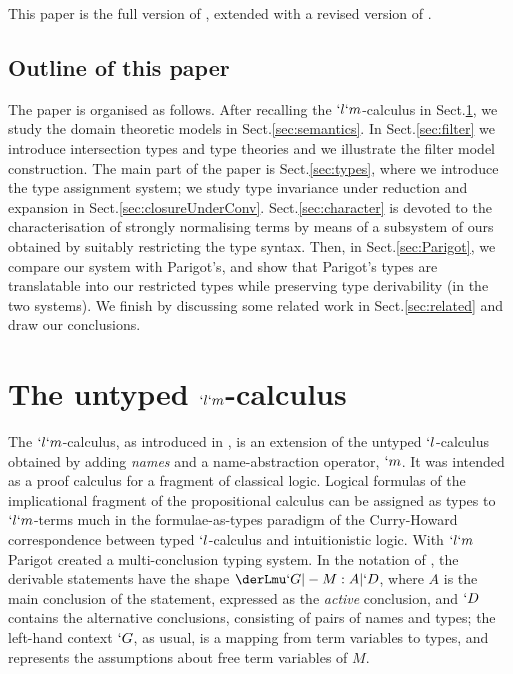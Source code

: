\documentclass{lmcs}
\begin{document}
\noindent
This paper is the full version of \cite{Bakel-Barbanera-deLiguoro-TLCA'11}, extended with a revised version of \cite{BakBdL-ITRS12}.

 \subsection*{Outline of this paper}
The paper is organised as follows. 
After recalling the $`l`m$-calculus in Sect.\skp\ref{sec:calculus}, we study the domain theoretic models in Sect.\skp\ref{sec:semantics}. 
In Sect.\skp\ref{sec:filter} we introduce intersection types and type theories and we illustrate the filter model construction.
The main part of the paper is Sect.\skp\ref{sec:types}, where we introduce the type assignment system; we study type invariance under reduction and expansion in Sect.\skp\ref{sec:closureUnderConv}.
Sect.\skp\ref{sec:character} is devoted to the characterisation of strongly normalising terms by means of a subsystem of ours obtained by suitably restricting the type syntax. 
Then, in Sect.\skp\ref{sec:Parigot}, we compare our system with Parigot's, and show that Parigot's types are translatable into our restricted types while preserving type derivability (in the two systems). 
We finish by discussing some related work in Sect.\skp\ref{sec:related} and draw our conclusions. 

% 

 \section{The untyped $`l`m$-calculus} \label{sec:calculus}
The $`l`m$-calculus, as introduced in \cite{Parigot'92}, is an extension of the untyped $`l$-calculus obtained by adding \emph{names} and a name-abstraction operator, $`m$. 
It was intended as a proof calculus for a fragment of classical logic. 
Logical formulas of the implicational fragment of the propositional calculus can be assigned as types to $`l`m$-terms much in the formulae-as-types paradigm of the Curry-Howard correspondence between typed $`l$-calculus and intuitionistic logic. 
With $`l`m$ Parigot created a multi-conclusion typing system. 
In the notation of \cite{Saurin'08}, the derivable statements have the shape $\derLmu `G |- M : A | `D $, where $A$ is the main conclusion of the statement, expressed as the \emph{active} conclusion, and $`D $ contains the alternative conclusions, consisting of pairs of names and types; the left-hand context $`G$, as usual, is a mapping from term variables to types, and represents the assumptions about free term variables of $M$.
\end{document}

